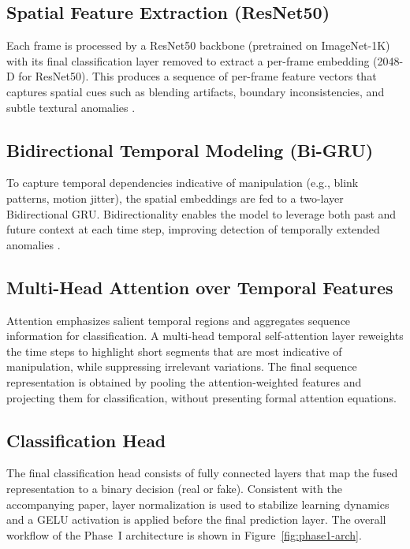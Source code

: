 \subsection{Spatial Feature Extraction (ResNet50)}
Each frame is processed by a ResNet50 backbone (pretrained on ImageNet-1K) with its final classification layer removed to extract a per-frame embedding (2048-D for ResNet50). This produces a sequence of per-frame feature vectors that captures spatial cues such as blending artifacts, boundary inconsistencies, and subtle textural anomalies \cite{rossler2019faceforensics,afchar2018mesonet}.

\subsection{Bidirectional Temporal Modeling (Bi-GRU)}
To capture temporal dependencies indicative of manipulation (e.g., blink patterns, motion jitter), the spatial embeddings are fed to a two-layer Bidirectional GRU. Bidirectionality enables the model to leverage both past and future context at each time step, improving detection of temporally extended anomalies \cite{guera2018deepfake,dey2017gru}.

\subsection{Multi-Head Attention over Temporal Features}
Attention emphasizes salient temporal regions and aggregates sequence information for classification. A multi-head temporal self-attention layer reweights the time steps to highlight short segments that are most indicative of manipulation, while suppressing irrelevant variations. The final sequence representation is obtained by pooling the attention-weighted features and projecting them for classification, without presenting formal attention equations.

\subsection{Classification Head}
The final classification head consists of fully connected layers that map the fused representation to a binary decision (real or fake). Consistent with the accompanying paper, layer normalization is used to stabilize learning dynamics and a GELU activation is applied before the final prediction layer.
The overall workflow of the Phase~I architecture is shown in Figure~\ref{fig:phase1-arch}.

